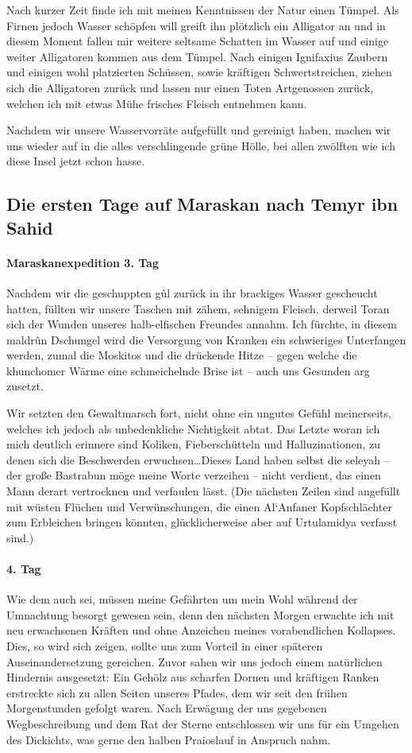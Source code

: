 Nach kurzer Zeit finde ich mit meinen Kenntnissen der Natur einen Tümpel. Als Firnen jedoch Wasser schöpfen will greift ihn plötzlich ein Alligator an und in diesem Moment fallen mir weitere seltsame Schatten im Wasser auf und einige weiter Alligatoren kommen aus dem Tümpel. Nach einigen Ignifaxius Zaubern und einigen wohl platzierten Schüssen, sowie kräftigen Schwertstreichen, ziehen sich die Alligatoren zurück und lassen nur einen Toten Artgenossen zurück, welchen ich mit etwas Mühe frisches Fleisch entnehmen kann. 

Nachdem wir unsere Wasservorräte aufgefüllt und gereinigt haben, machen wir uns wieder auf in die alles verschlingende grüne Hölle, bei allen zwölften wie ich diese Insel jetzt schon hasse.

\subsection{Die ersten Tage auf Maraskan nach Temyr ibn Sahid}

\paragraph{Maraskanexpedition 3. Tag}
Nachdem wir die geschuppten gûl zurück in ihr brackiges Wasser gescheucht hatten, füllten wir unsere Taschen mit zähem, sehnigem Fleisch, derweil Toran sich der Wunden unseres halb-elfischen Freundes annahm. Ich fürchte, in diesem maldrûn Dschungel wird die Versorgung von Kranken ein schwieriges Unterfangen werden, zumal die Moskitos und die drückende Hitze -- gegen welche die khunchomer Wärme eine schmeichelnde Brise ist -- auch uns Gesunden arg zusetzt. 

Wir setzten den Gewaltmarsch fort, nicht ohne ein ungutes Gefühl meinerseits, welches ich jedoch als unbedenkliche Nichtigkeit abtat. Das Letzte woran ich mich deutlich erinnere sind Koliken, Fieberschütteln und Halluzinationen, zu denen sich die Beschwerden erwuchsen\dots Dieses Land haben selbst die seleyah -- der große Bastrabun möge meine Worte verzeihen -- nicht verdient, das einen Mann derart vertrocknen und verfaulen lässt. (Die nächsten Zeilen sind angefüllt mit wüsten Flüchen und Verwünschungen, die einen Al`Anfaner Kopfschlächter zum Erbleichen bringen könnten, glücklicherweise aber auf Urtulamidya verfasst sind.)

\paragraph{4. Tag}
Wie dem auch sei, müssen meine Gefährten um mein Wohl während der Umnachtung besorgt gewesen sein, denn den nächsten Morgen erwachte ich mit neu erwachsenen Kräften und ohne Anzeichen meines vorabendlichen Kollapses. Dies, so wird sich zeigen, sollte uns zum Vorteil in einer späteren Auseinandersetzung gereichen. Zuvor sahen wir uns jedoch einem natürlichen Hindernis ausgesetzt: Ein Gehölz aus scharfen Dornen und kräftigen Ranken erstreckte sich zu allen Seiten unseres Pfades, dem wir seit den frühen Morgenstunden gefolgt waren. Nach Erwägung der uns gegebenen Wegbeschreibung und dem Rat der Sterne entschlossen wir uns für ein Umgehen des Dickichts, was gerne den halben Praioslauf in Anspruch nahm. 

